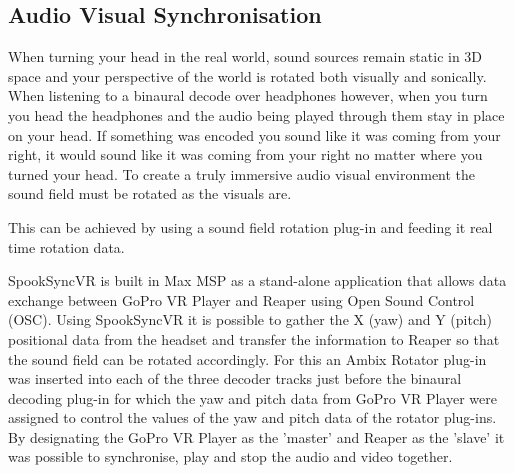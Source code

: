 		\subsection{Audio Visual Synchronisation}\label{avsync}

			When turning your head in the real world, sound sources remain static in 3D space and your perspective of the world is rotated both visually and sonically. When listening to a binaural decode over headphones however, when you turn you head the headphones and the audio being played through them stay in place on your head. If something was encoded you sound like it was coming from your right, it would sound like it was coming from your right no matter where you turned your head. To create a truly immersive audio visual environment the sound field must be rotated as the visuals are. 

			This can be achieved by using a sound field rotation plug-in and feeding it real time rotation data. 

			SpookSyncVR \cite{SpookSync} is built in Max MSP as a stand-alone application that allows data exchange between GoPro VR Player and Reaper using Open Sound Control (OSC). Using SpookSyncVR it is possible to gather the X (yaw) and Y (pitch) positional data from the headset and transfer the information to Reaper so that the sound field can be rotated accordingly. For this an Ambix Rotator plug-in was inserted into each of the three decoder tracks just before the binaural decoding plug-in for which the yaw and pitch data from GoPro VR Player were assigned to control the values of the yaw and pitch data of the rotator plug-ins. By designating the GoPro VR Player as the 'master' and Reaper as the 'slave' it was possible to synchronise, play and stop the audio and video together. 
	
		
